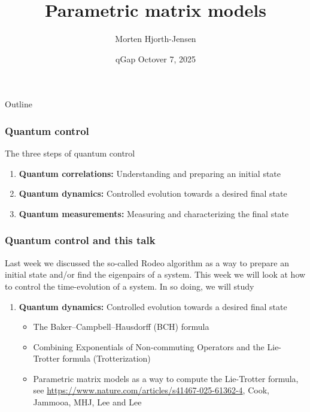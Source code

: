 \documentclass{beamer}
\begin{document}
\begin{frame}
\title[Quantum Computing and ML]{\textbf{Parametric matrix models}}
\author{Morten Hjorth-Jensen}
\date{qGap Octover 7, 2025}
\titlepage
\end{frame}



\begin{frame}{Outline}
\tableofcontents
\end{frame}


\begin{frame}
\frametitle{Quantum control}

\begin{block}{The three steps of quantum control}
\begin{enumerate}
\item {\bf Quantum correlations:} Understanding and preparing an initial state
\item {\bf Quantum dynamics:} Controlled evolution towards a desired final state
\item {\bf Quantum measurements:} Measuring and characterizing the final state
\end{enumerate}


\end{block}

\end{frame}

\begin{frame}
\frametitle{Quantum control and this talk}

Last week we discussed the so-called Rodeo algorithm as a way to
prepare an initial state and/or find the eigenpairs of a system. This
week we will look at how to control the time-evolution of a system. In
so doing, we will study
\begin{block}{}
\begin{enumerate}
\item {\bf Quantum dynamics:} Controlled evolution towards a desired final state
  \begin{itemize}
  \item The Baker–Campbell–Hausdorff (BCH) formula
  \item Combining Exponentials of Non-commuting Operators and the Lie-Trotter formula (Trotterization)
  \item Parametric matrix models as a way to compute the Lie-Trotter formula, see \url{https://www.nature.com/articles/s41467-025-61362-4}, Cook, Jammooa, MHJ, Lee and Lee
  \end{itemize}  
\end{enumerate}

\end{block}

\end{frame}
\end{document}
